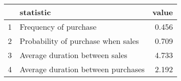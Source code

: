 \begin{tabular}{rlr}
  \hline
 & statistic & value \\ 
  \hline
1 & Frequency of purchase & 0.456 \\ 
  2 & Probability of purchase when sales & 0.709 \\ 
  3 & Average duration between sales & 4.733 \\ 
  4 & Average duration between purchases & 2.192 \\ 
   \hline
\end{tabular}
